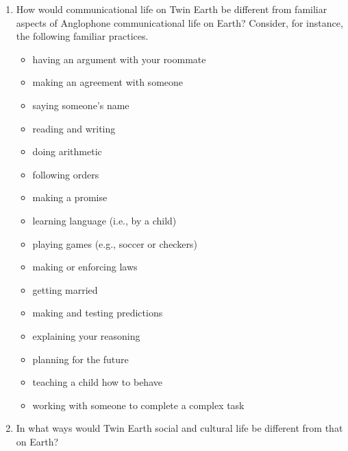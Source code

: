 \documentclass[]{article}
\providecommand{\tightlist}{%
  \setlength{\itemsep}{0pt}\setlength{\parskip}{0pt}}
\begin{document}
\begin{enumerate}
\def\labelenumi{\arabic{enumi}.}
\tightlist
\item
  How would communicational life on Twin Earth be different from
  familiar aspects of Anglophone communicational life on Earth?
  Consider, for instance, the following familiar practices.

  \begin{itemize}
  \tightlist
  \item
    having an argument with your roommate
  \item
    making an agreement with someone
  \item
    saying someone's name
  \item
    reading and writing
  \item
    doing arithmetic
  \item
    following orders
  \item
    making a promise
  \item
    learning language (i.e., by a child)
  \item
    playing games (e.g., soccer or checkers)
  \item
    making or enforcing laws
  \item
    getting married
  \item
    making and testing predictions
  \item
    explaining your reasoning
  \item
    planning for the future
  \item
    teaching a child how to behave
  \item
    working with someone to complete a complex task
  \end{itemize}
\item
  In what ways would Twin Earth social and cultural life be different
  from that on Earth?
\end{enumerate}
\end{document}
